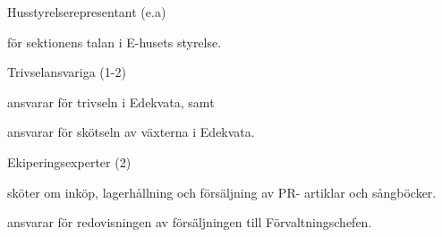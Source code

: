 \documentclass[10pt]{article}
\begin{document}
\begin{emptylist}
\begin{dashlist}
        \end{dashlist}
    \item Husstyrelserepresentant (e.a)
        \begin{dashlist}
            \item för sektionens talan i E-husets styrelse.
        \end{dashlist}
    \item Trivselansvariga (1-2)
        \begin{dashlist}
            \item ansvarar för trivseln i Edekvata, samt
            \item ansvarar för skötseln av växterna i Edekvata.
        \end{dashlist}
    \item Ekiperingsexperter (2)
        \begin{dashlist}
            \item sköter om inköp, lagerhållning och försäljning av PR- artiklar och sångböcker.
            \item ansvarar för redovisningen av försäljningen till Förvaltningschefen.
        \end{dashlist}
\end{emptylist}
\end{document}
